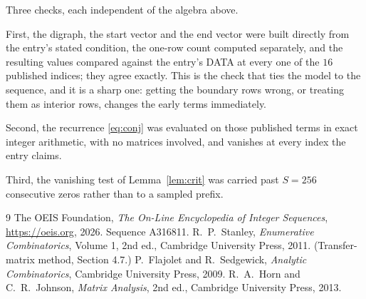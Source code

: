 \documentclass[11pt,a4paper]{article}
\theoremstyle{plain}
\theoremstyle{definition}
\begin{document}
Three checks, each independent of the algebra above.

First, the digraph, the start vector and the end vector were built directly from the
entry's stated condition, the one-row count computed separately, and the resulting values
compared against the entry's DATA at every one of the $16$ published indices; they
agree exactly. This is the check that ties the model to the sequence, and it is a sharp one:
getting the boundary rows wrong, or treating them as interior rows, changes the early terms
immediately.

Second, the recurrence \eqref{eq:conj} was evaluated on those published terms in exact
integer arithmetic, with no matrices involved, and vanishes at every index the entry claims.

Third, the vanishing test of Lemma~\ref{lem:crit} was carried past $S=256$ consecutive
zeros rather than to a sampled prefix.

\begin{thebibliography}{9}
 The OEIS Foundation, \emph{The On-Line Encyclopedia of Integer
Sequences}, \url{https://oeis.org}, 2026. Sequence A316811.
 R.~P.~Stanley, \emph{Enumerative Combinatorics}, Volume 1, 2nd ed.,
Cambridge University Press, 2011. (Transfer-matrix method, Section 4.7.)
 P.~Flajolet and R.~Sedgewick, \emph{Analytic Combinatorics}, Cambridge
University Press, 2009.
 R.~A.~Horn and C.~R.~Johnson, \emph{Matrix Analysis}, 2nd ed., Cambridge
University Press, 2013.
\end{thebibliography}
\end{document}
